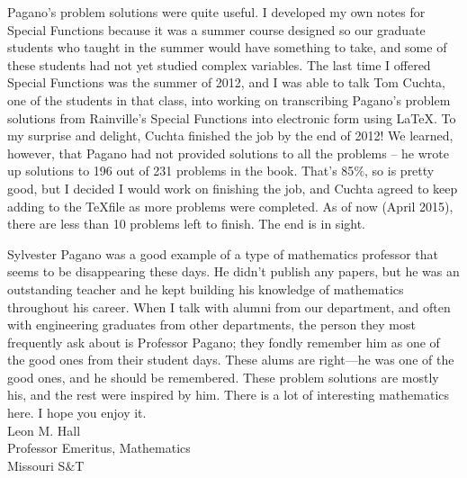 \documentclass{amsart}
\theoremstyle{definition}
\theoremstyle{remark}
\numberwithin{equation}{section}
\theoremstyle{plain}
\theoremstyle{definition}
\begin{document}
Pagano's problem solutions were quite useful.  I developed my own notes for Special Functions because it was a summer course designed so our graduate students who taught in the summer would have something to take, and some of these students had not yet studied complex variables.  The last time I offered Special Functions was the summer of 2012, and I was able to talk Tom Cuchta, one of the students in that class, into working on transcribing Pagano's problem solutions from Rainville's Special Functions into electronic form using \LaTeX .  To my surprise and delight, Cuchta finished the job by the end of 2012!  We learned, however, that Pagano had not provided solutions to all the problems – he wrote up solutions to 196 out of 231 problems in the book.  That's 85$\%$, so is pretty good, but I decided I would work on finishing the job, and Cuchta agreed to keep adding to the \TeX file as more problems were completed.  As of now (April 2015), there are less than 10 problems left to finish.  The end is in sight.

Sylvester Pagano was a good example of a type of mathematics professor that seems to be disappearing these days.  He didn't publish any papers, but he was an outstanding teacher and he kept building his knowledge of mathematics throughout his career.  When I talk with alumni from our department, and often with engineering graduates from other departments, the person they most frequently ask about is Professor Pagano; they fondly remember him as one of the good ones from their student days.  These alums are right---he was one of the good ones, and he should be remembered.  These problem solutions are mostly his, and the rest were inspired by him.  There is a lot of interesting mathematics here.  I hope you enjoy it.\vspace{10pt}\\
Leon M. Hall \\
Professor Emeritus, Mathematics\\
Missouri S$\&$T





















\end{document}
